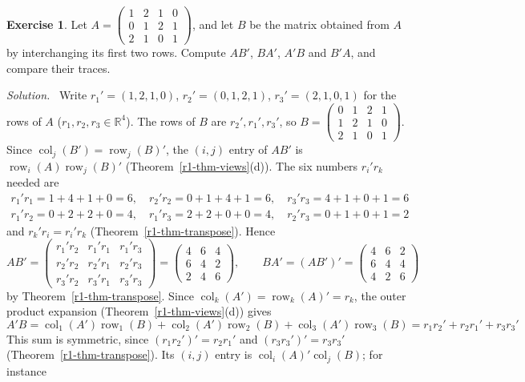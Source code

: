 \documentclass[12pt]{article}
\newcommand{\R}{\mathbb R}
\DeclareMathOperator{\row}{row}
\DeclareMathOperator{\col}{col}
\theoremstyle{definition}
\newtheorem{exercise}{Exercise}
\newenvironment{solution}{\par\noindent\textit{Solution.}\ }{\par\smallskip}
\begin{document}
\begin{exercise}\label{r1-ex-products}
Let \(A=\begin{pmatrix}1&2&1&0\\0&1&2&1\\2&1&0&1\end{pmatrix}\), and let \(B\) be the matrix
obtained from \(A\) by interchanging its first two rows. Compute \(AB'\), \(BA'\), \(A'B\) and
\(B'A\), and compare their traces.
\end{exercise}
\begin{solution}
Write \(r_1'=(1,2,1,0)\), \(r_2'=(0,1,2,1)\), \(r_3'=(2,1,0,1)\) for the rows of \(A\) (\(r_1,r_2,r_3\in\R^4\)). The rows
of \(B\) are \(r_2',r_1',r_3'\), so
\(B=\left(\begin{smallmatrix}0&1&2&1\\1&2&1&0\\2&1&0&1\end{smallmatrix}\right)\). Since
\(\col_j(B')=\row_j(B)'\), the \((i,j)\) entry of \(AB'\) is \(\row_i(A)\row_j(B)'\)
(Theorem~\ref{r1-thm-views}(d)). The six numbers \(r_i'r_k\) needed are
\[
\begin{gathered}
r_1'r_1=1+4+1+0=6,\quad r_2'r_2=0+1+4+1=6,\quad r_3'r_3=4+1+0+1=6\\
r_1'r_2=0+2+2+0=4,\quad r_1'r_3=2+2+0+0=4,\quad r_2'r_3=0+1+0+1=2
\end{gathered}
\]
and \(r_k'r_i=r_i'r_k\) (Theorem~\ref{r1-thm-transpose}). Hence
\[
AB'=\begin{pmatrix}r_1'r_2&r_1'r_1&r_1'r_3\\r_2'r_2&r_2'r_1&r_2'r_3\\r_3'r_2&r_3'r_1&r_3'r_3\end{pmatrix}
=\begin{pmatrix}4&6&4\\6&4&2\\2&4&6\end{pmatrix},\qquad
BA'=(AB')'=\begin{pmatrix}4&6&2\\6&4&4\\4&2&6\end{pmatrix}
\]
by Theorem~\ref{r1-thm-transpose}. Since \(\col_k(A')=\row_k(A)'=r_k\), the outer product expansion (Theorem~\ref{r1-thm-views}(d)) gives
\[
A'B=\col_1(A')\row_1(B)+\col_2(A')\row_2(B)+\col_3(A')\row_3(B)=r_1r_2'+r_2r_1'+r_3r_3'
\]
This sum is symmetric, since \((r_1r_2')'=r_2r_1'\) and \((r_3r_3')'=r_3r_3'\)
(Theorem~\ref{r1-thm-transpose}). Its \((i,j)\) entry is \(\col_i(A)'\col_j(B)\); for instance

\end{solution}
\end{document}
